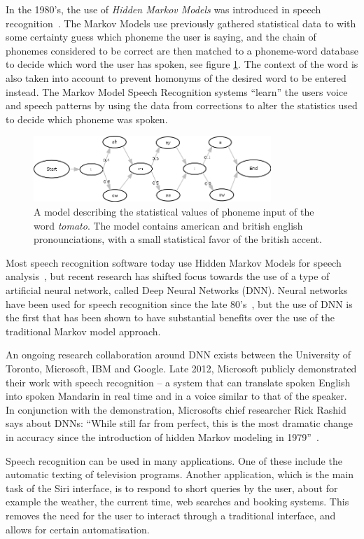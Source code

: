 In the 1980's, the use of \emph{Hidden Markov Models} was introduced in speech recognition~\cite{rabiner1986introduction}. The Markov Models use previously gathered statistical data to with some certainty guess which phoneme the user is saying, and the chain of phonemes considered to be correct are then matched to a phoneme-word database to decide which word the user has spoken, see figure \ref{tomato}. The context of the word is also taken into account to prevent homonyms of the desired word to be entered instead. The Markov Model Speech Recognition systems ``learn'' the users voice and speech patterns by using the data from corrections to alter the statistics used to decide which phoneme was spoken.

\begin{figure}[]
\center
\includegraphics[width=0.8\textwidth] {bilder/tomato.jpg}
\caption{A model describing the statistical values of phoneme input of the word \emph{tomato}. The model contains american and british english pronounciations, with a small statistical favor of the british accent.}
\label{tomato}
\end{figure}

Most speech recognition software today use Hidden Markov Models for speech analysis~\cite{DNN}, but recent research has shifted focus towards the use of a type of artificial neural network, called Deep Neural Networks (DNN). Neural networks have been used for speech recognition since the late 80's~\cite{waibel:phoneme}, but the use of DNN is the first that has been shown to have substantial benefits over the use of the traditional Markov model approach.

An ongoing research collaboration around DNN exists between the University of Toronto, Microsoft, IBM and Google. Late 2012, Microsoft publicly demonstrated their work with speech recognition -- a system that can translate spoken English into spoken Mandarin in real time and in a voice similar to that of the speaker. In conjunction with the demonstration, Microsofts chief researcher Rick Rashid says about DNNs: ``While still far from perfect, this is the most dramatic change in accuracy since the introduction of hidden Markov modeling in 1979''~\cite{chin}.

Speech recognition can be used in many applications. One of these include the automatic texting of television programs. Another application, which is the main task of the Siri interface, is to respond to short queries by the user, about for example the weather, the current time, web searches and booking systems. This removes the need for the user to interact through a traditional interface, and allows for certain automatisation.
